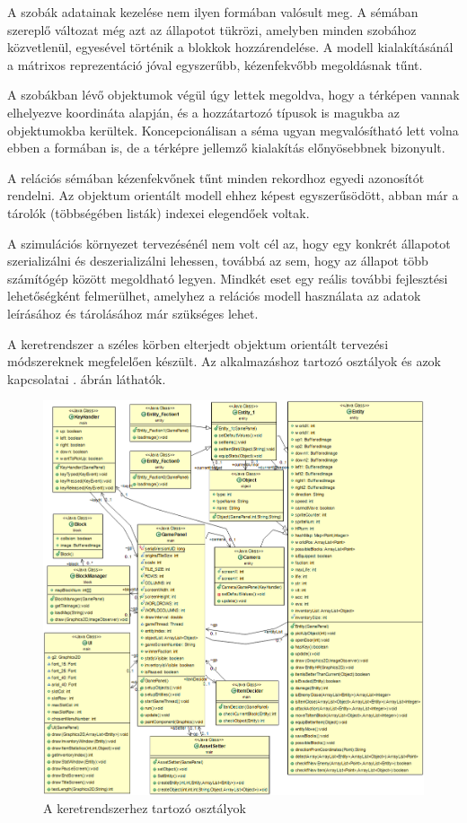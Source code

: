 A szobák adatainak kezelése nem ilyen formában valósult meg. A sémában szereplő változat még azt az állapotot tükrözi, amelyben minden szobához közvetlenül, egyesével történik a blokkok hozzárendelése. A modell kialakításánál a mátrixos reprezentáció jóval egyszerűbb, kézenfekvőbb megoldásnak tűnt.

A szobákban lévő objektumok végül úgy lettek megoldva, hogy a térképen vannak elhelyezve koordináta alapján, és a hozzátartozó típusok is magukba az objektumokba kerültek. Koncepcionálisan a séma ugyan megvalósítható lett volna ebben a formában is, de a térképre jellemző kialakítás előnyösebbnek bizonyult.

A relációs sémában kézenfekvőnek tűnt minden rekordhoz egyedi azonosítót rendelni. Az objektum orientált modell ehhez képest egyszerűsödött, abban már a tárolók (többségében listák) indexei elegendőek voltak.

A szimulációs környezet tervezésénél nem volt cél az, hogy egy konkrét állapotot szerializálni és deszerializálni lehessen, továbbá az sem, hogy az állapot több számítógép között megoldható legyen. Mindkét eset egy reális további fejlesztési lehetőségként felmerülhet, amelyhez a relációs modell használata az adatok leírásához és tárolásához már szükséges lehet.


A keretrendszer a széles körben elterjedt objektum orientált tervezési módszereknek megfelelően készült. Az alkalmazáshoz tartozó osztályok és azok kapcsolatai . ábrán láthatók.

\newpage

\begin{figure}[!ht]
    \centering
    \includegraphics[width=\textwidth]{images/UML.png}
    \caption{A keretrendszerhez tartozó osztályok}
    \label{fig:UML}
\end{figure}

